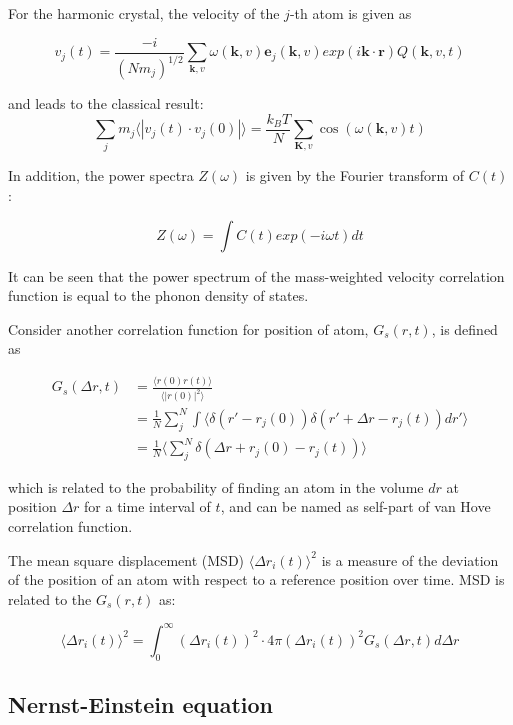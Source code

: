 \documentclass[twoside,twocolumn,9pt]{article}
\begin{document}
For  the harmonic crystal, the velocity of the $j$-th atom is given as

\begin{equation}
v_j(t)=\frac{-i}{(Nm_j)^{1/2}}\sum_{\textbf{k},v}\omega(\textbf{k},v)\textbf{e}_j(\textbf{k},v)exp(i\textbf{k}\cdot \textbf{r})Q(\textbf{k},v,t)
\end{equation}

and leads to the classical result:
\begin{equation}
\sum_j  m_j \langle |v_j(t)\cdot v_j(0) |\rangle = \frac{k_B T}{N}\sum_{\textbf{K},v}\cos (\omega(\textbf{k}, v)t)
\end{equation}

In addition, the power spectra $Z(\omega)$ is given by the Fourier transform of $C(t)$:

\begin{equation}
Z(\omega)=\int C(t)exp(-i\omega t)dt
\end{equation}

It can be seen that the power spectrum of the mass-weighted velocity correlation function is equal to the phonon density of states.

Consider another correlation function for position of atom, $G_s(r,t)$, is defined as

\begin{align*}
G_s(\Delta r,t)&=\frac{\langle r(0)r(t)\rangle}{\langle | r(0)|^2 \rangle} \\
        &=\frac{1}{N}\sum_{j}^{N}\int \langle \delta(r'-r_j(0))\delta(r'+\Delta r -r_j(t))dr' \rangle \\
        &=\frac{1}{N}\langle \sum_{j}^{N}\delta(\Delta r +r_j(0)-r_j(t))\rangle
\end{align*}

which is related to the probability of finding an atom in the volume $dr$ at position $\Delta r$ for a time interval of $t$,
and can be named as self-part of van Hove correlation function.

The mean square displacement (MSD) $\langle \Delta r_i(t)\rangle ^2$  is a measure of the deviation of the position of an atom with
respect to a reference position over time. MSD is related to the $G_s(r,t)$ as:

\begin{equation}
  \langle \Delta r_i(t)\rangle ^2=\int_{0}^{\infty} (\Delta r_i(t))^2\cdot 4\pi(\Delta r_i(t))^2G_s(\Delta r,t)d\Delta r
\end{equation}

\subsection{ Nernst-Einstein  equation}
\end{document}
